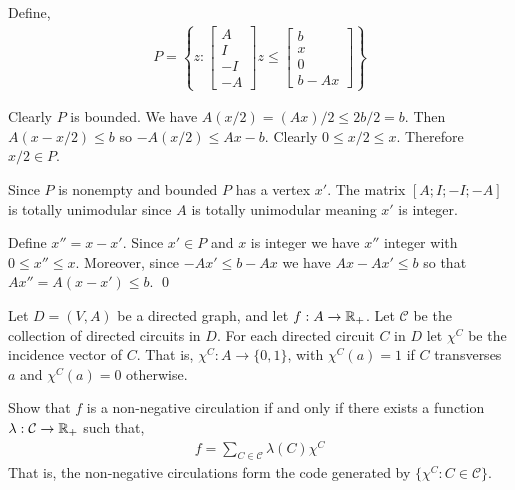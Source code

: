 \documentclass[10pt]{article}
\begin{document}
\begin{solution}

Define,
\begin{align*}
    P = \left\{ z : \left[\begin{array}{r}A\\I\\-I\\-A\end{array}\right]z \leq \left[\begin{array}{l} b \\ x \\ 0 \\ b-Ax\end{array}\right] \right\}
\end{align*}

Clearly \( P \) is bounded. We have \( A(x/2) = (Ax)/2 \leq 2b/2 = b \). Then \( A(x-x/2) \leq b  \) so \( -A(x/2) \leq Ax-b \). Clearly \( 0\leq x/2 \leq x \). Therefore \( x/2\in P \).

Since \( P \) is nonempty and bounded \( P \) has a vertex \( x' \). The matrix \( [A;I;-I;-A] \) is totally unimodular since \( A \) is totally unimodular meaning \( x' \) is integer.

Define \( x'' = x-x' \). Since \( x'\in P \) and \( x \) is integer we have \( x'' \) integer with \( 0\leq x'' \leq x \). Moreover, since \( -Ax' \leq b-Ax \) we have \( Ax-Ax' \leq b \) so that \( Ax'' = A(x-x') \leq  b \). \qed

\end{solution}

\begin{problem}[Problem 4.15]
    Let \( D = (V,A) \) be a directed graph, and let \( f:A\to\mathbb{R}_+ \). Let \( \mathcal{C} \) be the collection of directed circuits in \( D \). For each directed circuit \( C \) in \( D \) let \( \chi^C \) be the incidence vector of \( C \). That is, \( \chi^C:A\to\{0,1\} \), with \( \chi^C(a) = 1 \) if \( C \) transverses \( a \) and \( \chi^C(a) = 0 \) otherwise.

Show that \( f \) is a non-negative circulation if and only if there exists a function \( \lambda: \mathcal{C}  \to \mathbb{R}_+ \) such that,
\begin{align*}
    f = \sum_{C\in \mathcal{C}} \lambda(C) \chi^C
\end{align*}
That is, the non-negative circulations form the code generated by \( \{ \chi^C : C\in \mathcal{C} \} \).
\end{problem}
\end{document}
